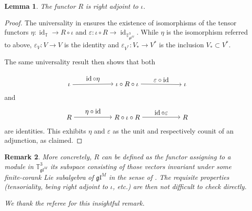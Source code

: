 \documentclass[11pt]{article}
\theoremstyle{plain}
\newtheorem{lemma}{Lemma}[section]
\theoremstyle{nonumberplain}
\theoremstyle{plain}
\newtheorem{remark}[lemma]{Remark}
\theoremstyle{nonumberplain}
\newtheorem{proof}{Proof}
\newcommand\bT{{\mathbb T}}
\newcommand\fgl{\mathfrak{gl}}
\DeclareMathOperator{\id}{id}
\begin{document}
\begin{lemma}\label{le.R_right_adj}
  The functor $R$ is right adjoint to $\iota$. 
\end{lemma}
\begin{proof}
The universality in  ensures the existence of isomorphisms of the tensor functors $\eta:\id_{\bT}\to R\circ\iota$ and $\varepsilon:\iota\circ R\to\id_{\bT^3_{\fgl^M}}$. While $\eta$ is the isomorphism referred to above, $\varepsilon_V:V\to V$ is the identity and $\varepsilon_{V^*}:V_*\to V^*$ is the inclusion $V_*\subset V^*$.   

The same universality result then shows that both

\begin{equation*}
  \begin{tikzpicture}[auto,baseline=(current  bounding  box.center)]
    \path[anchor=base] (0,0) node (1) {$\iota$} +(3,0) node (2) {$\iota\circ R\circ\iota$} +(6,0) node (3) {$\iota$};
         \draw[->] (1) to node[auto,pos=.5] {$\id\circ \eta$} (2);
         \draw[->] (2) to node[auto,pos=.5] {$\varepsilon\circ\id $} (3);
  \end{tikzpicture}
\end{equation*}
and
\begin{equation*}
  \begin{tikzpicture}[auto,baseline=(current  bounding  box.center)]
    \path[anchor=base] (0,0) node (1) {$R$} +(3,0) node (2) {$R\circ \iota\circ R$} +(6,0) node (3) {$R$};
         \draw[->] (1) to node[auto,pos=.5] {$\eta\circ \id$} (2);
         \draw[->] (2) to node[auto,pos=.5] {$\id\circ \varepsilon$} (3);
  \end{tikzpicture}
\end{equation*}
are identities. This exhibits $\eta$ and $\varepsilon$ as the unit and respectively counit of an adjunction, as claimed. 
\end{proof}


\begin{remark}\label{re.rk}
  More concretely, $R$ can be defined as the functor assigning to a module in $\bT^3_{\fgl^M}$ its subspace consisting of those vectors invariant under some {\it finite-corank} Lie subalgebra of $\fgl^M$ in the sense of \cite[$\S$7.3]{PS2}. The requisite properties (tensoriality, being right adjoint to $\iota$, etc.) are then not difficult to check directly.  
  
  We thank the  referee for this insightful remark.
\end{remark}
\end{document}
